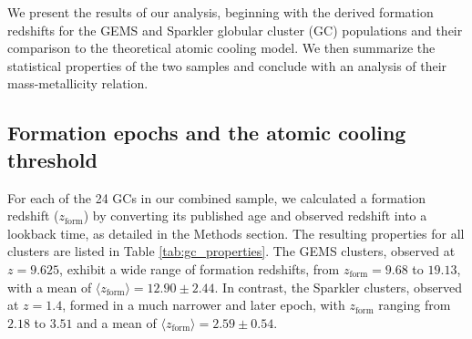 \documentclass[]{article}
\begin{document}
We present the results of our analysis, beginning with the derived formation redshifts for the GEMS and Sparkler globular cluster (GC) populations and their comparison to the theoretical atomic cooling model. We then summarize the statistical properties of the two samples and conclude with an analysis of their mass-metallicity relation.

\subsection{Formation epochs and the atomic cooling threshold}

For each of the 24 GCs in our combined sample, we calculated a formation redshift ($z_\mathrm{form}$) by converting its published age and observed redshift into a lookback time, as detailed in the Methods section. The resulting properties for all clusters are listed in Table \ref{tab:gc_properties}. The GEMS clusters, observed at $z=9.625$, exhibit a wide range of formation redshifts, from $z_\mathrm{form} = 9.68$ to $19.13$, with a mean of $\langle z_\mathrm{form} \rangle = 12.90 \pm 2.44$. In contrast, the Sparkler clusters, observed at $z=1.4$, formed in a much narrower and later epoch, with $z_\mathrm{form}$ ranging from $2.18$ to $3.51$ and a mean of $\langle z_\mathrm{form} \rangle = 2.59 \pm 0.54$.
\end{document}
